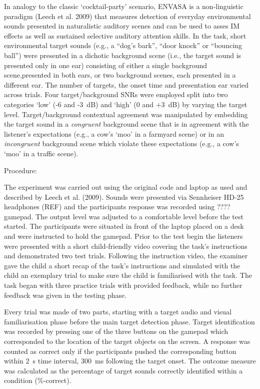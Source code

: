 \documentclass[a4paper,nobind]{templates/ociamthesis}
\begin{document}
In analogy to the classic `cocktail-party' scenario, ENVASA is a non-linguistic paradigm (Leech et al. 2009) that measures detection of everyday environmental sounds presented in naturalistic auditory scenes and can be used to asses IM effects as well as sustained selective auditory attention skills. In the task, short environmental target sounds (e.g., a ``dog's bark'', ``door knock'' or ``bouncing ball'') were presented in a dichotic background scene (i.e., the target sound is presented only in one ear) consisting of either a single background scene,presented in both ears, or two background scenes, each presented in a different ear. The number of targets, the onset time and presentation ear varied across trials. Four target/background SNRs were employed split into two categories `low' (-6 and -3~dB) and `high' (0 and +3~dB) by varying the target level. Target/background contextual agreement was manipulated by embedding the target sound in a \emph{congruent} background scene that is in agreement with the listener's expectations (e.g., a cow's `moo' in a farmyard scene) or in an \emph{incongruent} background scene which violate these expectations (e.g., a cow's `moo' in a traffic scene).

Procedure:

The experiment was carried out using the original code and laptop as used and described by Leech et al. (2009). Sounds were presented via Sennheiser HD-25 headphones (REF) and the participants response was recorded using ???? gamepad. The output level was adjusted to a comfortable level before the test started. The participants were situated in front of the laptop placed on a desk and were instructed to hold the gamepad. Prior to the test begin the listeners were presented with a short child-friendly video covering the task's instructions and demonstrated two test trials. Following the instruction video, the examiner gave the child a short recap of the task's instructions and simulated with the child an exemplary trial to make sure the child is familiarised with the task. The task began with three practice trials with provided feedback, while no further feedback was given in the testing phase.

Every trial was made of two parts, starting with a target audio and visual familiarisation phase before the main target detection phase. Target identification was recorded by pressing one of the three buttons on the gamepad which corresponded to the location of the target objects on the screen. A response was counted as correct only if the participants pushed the corresponding button within 2~s time interval, 300~ms following the target onset. The outcome measure was calculated as the percentage of target sounds correctly identified within a condition (\%-correct).
\end{document}
